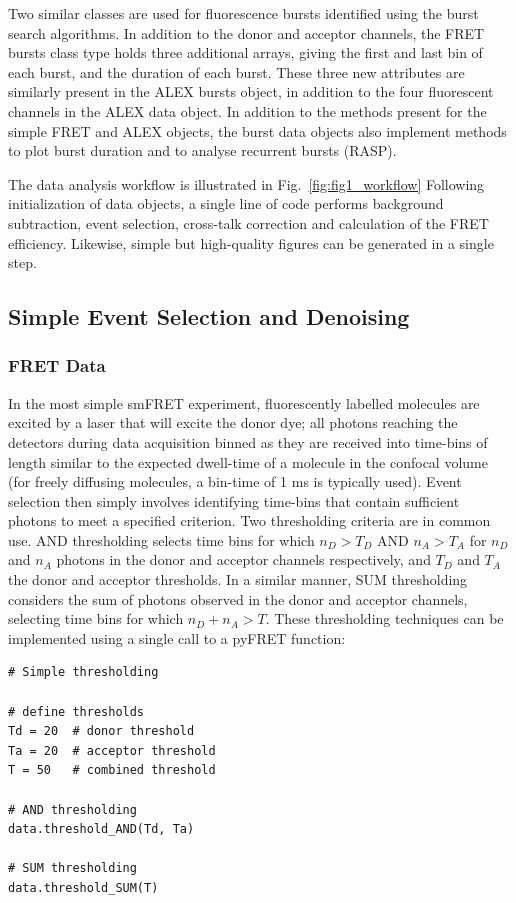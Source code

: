 \documentclass[10pt]{article}
\begin{document}
Two similar classes are used for fluorescence bursts identified using the burst search algorithms. In addition to the donor and acceptor channels, the FRET bursts class type holds three additional arrays, giving the first and last bin of each burst, and the duration of each burst. These three new attributes are similarly present in the ALEX bursts object, in addition to the four fluorescent channels in the ALEX data object. In addition to the methods present for the simple FRET and ALEX objects, the burst data objects also implement methods to plot burst duration and to analyse recurrent bursts (RASP). 

The data analysis workflow is illustrated in Fig.~\ref{fig:fig1_workflow} Following initialization of data objects, a single line of code performs background subtraction, event selection, cross-talk correction and calculation of the FRET efficiency. Likewise, simple but high-quality figures can be generated in a single step.

\subsection*{Simple Event Selection and Denoising}
\subsubsection*{FRET Data}
In the most simple smFRET experiment, fluorescently labelled molecules are excited by a laser that will excite the donor dye; all photons reaching the detectors during data acquisition binned as they are received into time-bins of length similar to the expected dwell-time of a molecule in the confocal volume (for freely diffusing molecules, a bin-time of 1 ms is typically used). Event selection then simply involves identifying time-bins that contain sufficient photons to meet a specified criterion. Two thresholding criteria are in common use. AND thresholding selects time bins for which $n_D > T_D$ AND $n_A > T_A$ for $n_D$ and $n_A$ photons in the donor and acceptor channels respectively, and $T_D$ and $T_A$ the donor and acceptor thresholds. In a similar manner, SUM thresholding considers the sum of photons observed in the donor and acceptor channels, selecting time bins for which $n_D + n_A > T$. These thresholding techniques can be implemented using a single call to a pyFRET function: 

\begin{lstlisting}
# Simple thresholding

# define thresholds
Td = 20  # donor threshold
Ta = 20  # acceptor threshold
T = 50   # combined threshold

# AND thresholding
data.threshold_AND(Td, Ta)

# SUM thresholding
data.threshold_SUM(T)
\end{lstlisting}
\end{document}
